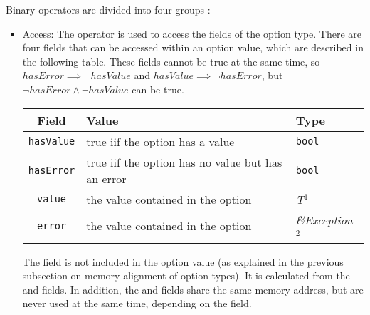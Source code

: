 Binary operators are divided into four groups :
\begin{itemize}
\item Access: The  operator is used to access the fields of the option
  type. There are four fields that can be accessed within an option value, which
  are described in the following table. These fields cannot be true at the same
  time, so $hasError \implies \lnot hasValue$ and $hasValue \implies \lnot
  hasError$, but $\lnot hasError \land \lnot hasValue$ can be true.

  \begin{center}\begin{adjustbox}{max width=1.0\linewidth}
      \begin{threeparttable}
        \begin{tabular}{|c|ll|}
          \hline
          Field & Value & Type \\
          \hline
          \hline
          \texttt{hasValue} & true iif the option has a value & \texttt{bool} \\
          \texttt{hasError} & true iif the option has no value but has an error & \texttt{bool} \\
          \Xhline{0.001pt}
          \texttt{value} & the value contained in the option & \textit{T}$^{1^{\phantom{j}}}$ \\
          \texttt{error} & the value contained in the option & \textit{\&Exception}$^{2^{\phantom{j}}}$ \\
          \hline
        \end{tabular}
      \end{threeparttable}
  \end{adjustbox}\end{center}

  The  field is not included in the option value (as explained
  in the previous subsection on memory alignment of option types). It is
  calculated from the  and  fields. In addition, the
   and  fields share the same memory address, but
  are never used at the same time, depending on the  field.


\end{itemize}
